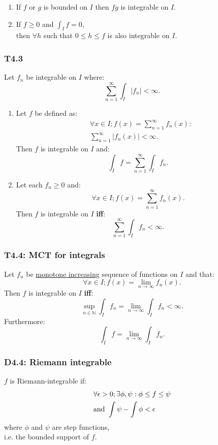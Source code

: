 \documentclass{article}
\begin{document}
\begin{multicols*}{3}
\begin{enumerate}
    \item If $f$ or $g$ is bounded on $I$
    then $fg$ is integrable on $I$.

    \item If $f\geq0$ and $\displaystyle\int_I f=0$, \\
    then $\forall h$ such that 
    $0\leq h\leq f$ is also integrable on $I$.
\end{enumerate}

\subsubsection*{T4.3}
Let $f_n$ be integrable on $I$ where:
$$\sum_{n=1}^{\infty}\int_I |f_n|<\infty.$$
\begin{enumerate}
    \item Let $f$ be defined as:
    \begin{align*}
        &\forall x\in I;f(x)=\sum_{n=1}^{\infty}f_n(x)
        : \\ &\sum_{n=1}^{\infty}|f_n(x)|<\infty.
    \end{align*}
    Then $f$ is integrable on $I$ and:
    $$\int_I f=\sum_{n=1}^{\infty}\int_I f_n.$$

    \item Let each $f_n\geq0$ and:
    $$\forall x\in I; f(x)=\sum_{n=1}^{\infty}f_n(x).$$
    Then $f$ is integrable on $I$ \textbf{if{}f}:
    $$\sum_{n=1}^{\infty}\int_I f_n<\infty.$$
    
\end{enumerate}

\subsubsection*{T4.4: MCT for integrals}
Let $f_n$ be \underline{monotone increasing}
sequence of functions on $I$ and that:
$$\forall x\in I;f(x)=\lim_{n\rightarrow\infty}f_n(x).$$
Then $f$ is integrable on $I$ \textbf{if{}f}:
$$\sup_{n\in\mathbb{N}}\int_I f_n
=\lim_{n\rightarrow\infty}\int_I f_n<\infty.$$
Furthermore:
$$\int_I f=\lim_{n\rightarrow\infty}\int_I f_n.$$

\subsubsection*{D4.4: Riemann integrable}
$f$ is Riemann-integrable if:
\begin{align*}
    &\forall\epsilon>0; \exists\phi,
    \psi:\phi\leq f\leq\psi \\
    &\text{and}\hspace*{0.05in}
    \int\psi-\int\phi<\epsilon
\end{align*}
where $\phi$ and $\psi$ are step functions, \\
i.e. the bounded support of $f$.


\end{multicols*}
\end{document}
